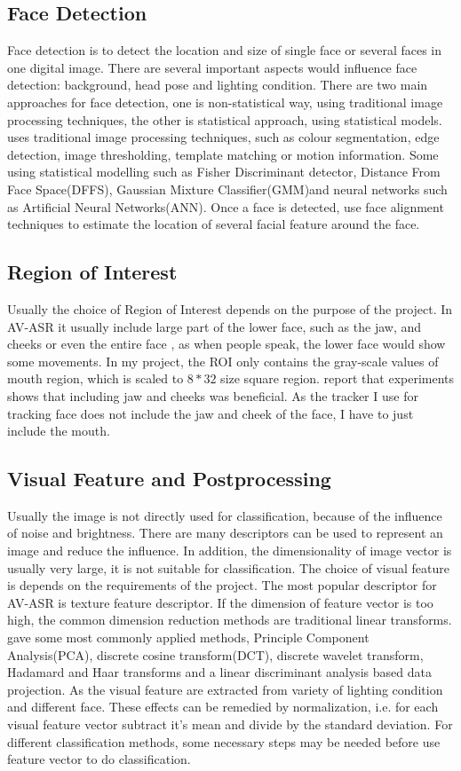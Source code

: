 \subsection{Face Detection}
Face detection is to detect the location and size of single face or several faces in one digital image. There are several important aspects would influence face detection: background, head pose and lighting condition. There are two main approaches for face detection, one is non-statistical way, using traditional image processing techniques, the other is statistical approach, using statistical models. \cite{potamianos2003recent} uses traditional image processing techniques, such as colour segmentation, edge detection, image thresholding, template matching or motion information. Some using statistical modelling such as Fisher Discriminant detector, Distance From Face Space(DFFS), Gaussian Mixture Classifier(GMM)and neural networks such as Artificial Neural Networks(ANN). Once a face is detected, use face alignment techniques to estimate the location of several facial feature around the face.
\subsection{Region of Interest}
Usually the choice of Region of Interest depends on the purpose of the project. In AV-ASR it usually include large part of the lower face, such as the jaw, and cheeks or even the entire face \cite{potamianos2003recent}, as when people speak, the lower face would show some movements. In my project, the ROI only contains the gray-scale values of mouth region, which is scaled to $8 * 32$ size square region. \cite{potamianos2003recent} report that experiments shows that including jaw and cheeks was beneficial. As the tracker I use for tracking face does not include the jaw and cheek of the face, I have to just include the mouth.
\subsection{Visual Feature and Postprocessing}
Usually the image is not directly used for classification, because of the influence of noise and brightness. There are many descriptors can be used to represent an image and reduce the influence. In addition, the dimensionality of image vector is usually very large, it is not suitable for classification. The choice of visual feature is depends on the requirements of the project. The most popular descriptor for AV-ASR is texture feature descriptor. If the dimension of feature vector is too high, the common dimension reduction methods are traditional linear transforms. \cite{potamianos2003recent} gave some most commonly applied methods, Principle Component Analysis(PCA), discrete cosine transform(DCT), discrete wavelet transform, Hadamard and Haar transforms and a linear discriminant analysis based data projection. As the visual feature are extracted from variety of lighting condition and different face. These effects can be remedied by normalization, i.e. for each visual feature vector subtract it's mean and divide by the standard deviation. For different classification methods, some necessary steps may be needed before use feature vector to do classification.
